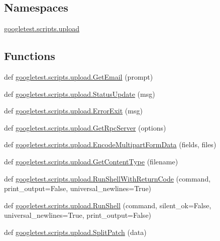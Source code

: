 \subsection*{Namespaces}
\begin{DoxyCompactItemize}
\item 
 \mbox{\hyperlink{namespacegoogletest_1_1scripts_1_1upload}{googletest.\+scripts.\+upload}}
\end{DoxyCompactItemize}
\subsection*{Functions}
\begin{DoxyCompactItemize}
\item 
def \mbox{\hyperlink{namespacegoogletest_1_1scripts_1_1upload_a44f3e1b668cef3e193bc281562d1f46e}{googletest.\+scripts.\+upload.\+Get\+Email}} (prompt)
\item 
def \mbox{\hyperlink{namespacegoogletest_1_1scripts_1_1upload_a71b3adc6c00b755df26b2023c53c55be}{googletest.\+scripts.\+upload.\+Status\+Update}} (msg)
\item 
def \mbox{\hyperlink{namespacegoogletest_1_1scripts_1_1upload_afb9e613fe19c0db2466c7ad56e0f7aa2}{googletest.\+scripts.\+upload.\+Error\+Exit}} (msg)
\item 
def \mbox{\hyperlink{namespacegoogletest_1_1scripts_1_1upload_a0f71ac3e4c2082d3cbd0110bb609d435}{googletest.\+scripts.\+upload.\+Get\+Rpc\+Server}} (options)
\item 
def \mbox{\hyperlink{namespacegoogletest_1_1scripts_1_1upload_a786fd293b124649f907ce899576480e5}{googletest.\+scripts.\+upload.\+Encode\+Multipart\+Form\+Data}} (fields, files)
\item 
def \mbox{\hyperlink{namespacegoogletest_1_1scripts_1_1upload_a874a70c797078a2642e20967faa1b1da}{googletest.\+scripts.\+upload.\+Get\+Content\+Type}} (filename)
\item 
def \mbox{\hyperlink{namespacegoogletest_1_1scripts_1_1upload_acfe1081939d510cd5321a3d2f14adf06}{googletest.\+scripts.\+upload.\+Run\+Shell\+With\+Return\+Code}} (command, print\+\_\+output=False, universal\+\_\+newlines=True)
\item 
def \mbox{\hyperlink{namespacegoogletest_1_1scripts_1_1upload_ab3b608e49917e5165cfb2624e8e469a1}{googletest.\+scripts.\+upload.\+Run\+Shell}} (command, silent\+\_\+ok=False, universal\+\_\+newlines=True, print\+\_\+output=False)
\item 
def \mbox{\hyperlink{namespacegoogletest_1_1scripts_1_1upload_aeaadc3f722b1f6f78bb0f575bfadcaf9}{googletest.\+scripts.\+upload.\+Split\+Patch}} (data)

\end{DoxyCompactItemize}
